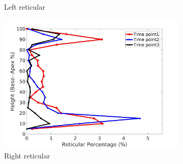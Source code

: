 \begin{figure}[H]
\begin{subfigure}{.42\linewidth}
  \caption{Left reticular}
  \label{fig:IPF9DiseaseAgainstHeight-c} 
\end{subfigure} 
\begin{subfigure}{.42\linewidth}%
  \includegraphics[width=\linewidth,trim={{.0\wd0} {.0\wd0} {.0\wd0} {.0\wd0}},clip]{Appendix/Image_AppexA/BaseToApex/IPF9RightLungReticularDiseaseAgainstHeight.jpg}
  \caption{Right reticular}
  \label{fig:IPF9DiseaseAgainstHeight-d}
\end{subfigure}
\begin{subfigure}{.42\linewidth}%

\end{subfigure}
\end{figure}
